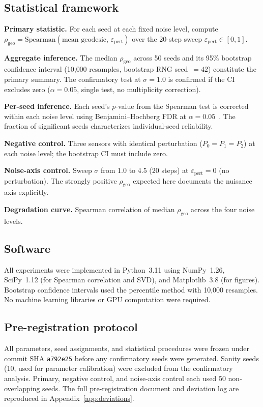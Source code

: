 \documentclass[11pt]{article}
\newcommand{\eps}{\varepsilon}
\newcommand{\epspert}{\eps_\mathrm{pert}}
\newcommand{\rhogeo}{\rho_\mathrm{geo}}
\begin{document}
\subsection{Statistical framework}

\textbf{Primary statistic.}  For each seed at each fixed noise
level, compute $\rhogeo = \mathrm{Spearman}(\text{mean geodesic},
\, \epspert)$ over the 20-step sweep $\epspert \in [0, 1]$.

\textbf{Aggregate inference.}  The median $\rhogeo$ across 50
seeds and its 95\% bootstrap confidence interval
\citep{efron1979bootstrap} (10{,}000 resamples, bootstrap RNG
seed~$= 42$) constitute the primary summary.  The confirmatory
test at $\sigma = 1.0$ is confirmed if the CI excludes zero
($\alpha = 0.05$, single test, no multiplicity correction).

\textbf{Per-seed inference.}  Each seed's $p$-value from the
Spearman test is corrected within each noise level using
Benjamini--Hochberg FDR at $\alpha =
0.05$~\citep{benjamini1995controlling}.  The fraction of
significant seeds characterizes individual-seed reliability.

\textbf{Negative control.}  Three sensors with identical
perturbation ($P_0 = P_1 = P_2$) at each noise level; the
bootstrap CI must include zero.

\textbf{Noise-axis control.}  Sweep $\sigma$ from 1.0 to 4.5
(20 steps) at $\epspert = 0$ (no perturbation).  The strongly
positive $\rhogeo$ expected here documents the nuisance axis
explicitly.

\textbf{Degradation curve.}  Spearman correlation of median
$\rhogeo$ across the four noise levels.

\subsection{Software}

All experiments were implemented in Python~3.11 using NumPy~1.26,
SciPy~1.12 (for Spearman correlation and SVD), and
Matplotlib~3.8 (for figures).  Bootstrap confidence intervals used
the percentile method with 10{,}000 resamples.  No machine learning
libraries or GPU computation were required.

\subsection{Pre-registration protocol}

All parameters, seed assignments, and statistical procedures were
frozen under commit SHA \texttt{a792e25} before any confirmatory
seeds were generated.  Sanity seeds (10, used for parameter
calibration) were excluded from the confirmatory analysis.
Primary, negative control, and noise-axis control each used 50
non-overlapping seeds.  The full pre-registration document and
deviation log are reproduced in Appendix~\ref{app:deviations}.
\end{document}
